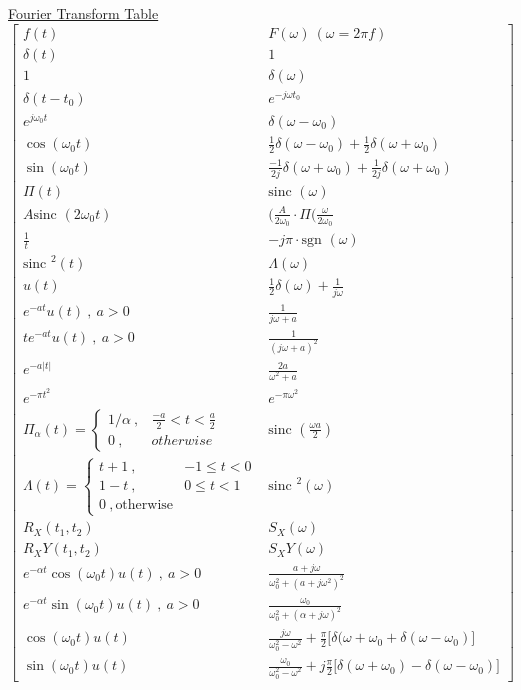\documentclass[12pt]{article}
\def\sinc{\text{sinc\ }} %
\def\sgn{\text{sgn\ }} %
\begin{document}
\begin{flushleft}
	\uline{Fourier Transform Table} \linebreak 
	$$ \begin{bmatrix}
	f(t) & F(\omega) \ (\omega = 2\pi f) \\ 
	\delta(t) & 1 \\ 
	1 & \delta(\omega) \\ 
	\delta (t-t_0) & e^{-j\omega t_0} \\ 
	e^{j\omega_0 t} & \delta (\omega - \omega_0) \\ 
	\cos (\omega_0 t)  &  \frac{1}{2} \delta(\omega - \omega_0) + \frac{1}{2} \delta (\omega + \omega_0)  \\ 
	\sin (\omega_0 t)  &  \frac{-1}{2j} \delta(\omega + \omega_0) + \frac{1}{2j} \delta (\omega + \omega_0)  \\ 
	\Pi(t) & \sinc (\omega) \\ 
	A \sinc (2\omega_0 t) & (\frac{A}{2\omega_0} \cdot \Pi (\frac{\omega}{2\omega_0} \\ 
	\frac{1}{t}  & -j \pi \cdot \sgn(\omega) \\ 
	\sinc^2(t) &  \Lambda (\omega) \\ 
	u(t) & \frac{1}{2} \delta (\omega) + \frac{1}{j\omega}  \\ 
	e^{-at} u(t) \ , \ a>0 & \frac{1}{j\omega + a} \\ 
	te^{-at} u(t) \ , \ a>0 & \frac{1}{(j\omega + a)^2} \\ 
	e^{-a|t|}  & \frac{2a}{\omega^2 + a} \\ 
	e^{-\pi t^2} & e^{-\pi \omega^2} \\ 
	\Pi_{\alpha} (t) = \begin{cases} 1/\alpha \ , & \frac{-a}{2} < t < \frac{a}{2} \\ 0 \ , & otherwise \end{cases}  & \sinc\left( \frac{\omega a}{2} \right)  \\
	\Lambda(t) = \begin{cases} t+1 \ , & -1 \leq t < 0 \\ 1-t \ , & 0 \leq t < 1 \\ 0 \ , \text{otherwise} \end{cases} & \sinc^2(\omega) \\
	R_X (t_1, t_2) &  S_X(\omega) \\ 
	R_XY (t_1, t_2)  & S_XY (\omega) \\ 
	e^{-\alpha t} \cos (\omega_0 t) u(t) \ , \ a>0 & \frac{a+j\omega}{\omega_0^2 + (a+j\omega^2)^2}  \\ 
	e^{-\alpha t} \sin (\omega_0 t) u(t) \ , \ a>0 & \frac{\omega_0}{\omega_0^2 + (\alpha + j\omega)^2}  \\ 
	\cos (\omega_0 t) u(t) & \frac{j\omega}{\omega_0^2 - \omega^2} + \frac{\pi}{2} \big[ \delta(\omega + \omega_0 + \delta ( \omega - \omega_0) \big]  \\
	\sin (\omega_0 t) u(t) & \frac{\omega_0}{\omega_0^2 -\omega^2} + j\frac{\pi}{2} \big[ \delta(\omega + \omega_0) - \delta (\omega - \omega_0) \big]  
	\end{bmatrix} $$
	

\end{flushleft}
\end{document}
